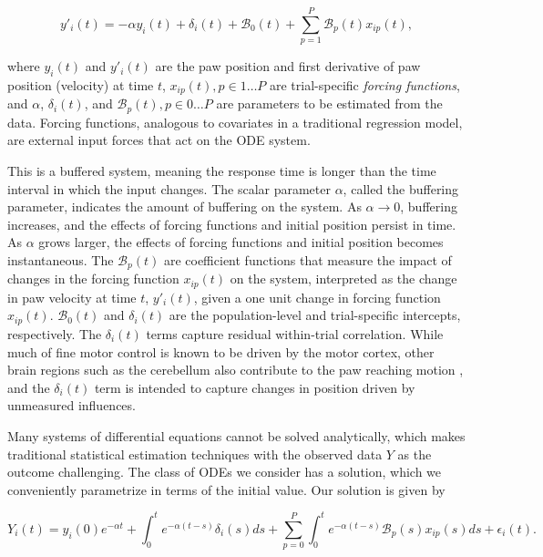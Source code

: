 \documentclass[preprint]{JASA}
\begin{document}
\begin{equation}
\label{eq:flode_deriv}
y'_i(t) = -\alpha y_i(t) + \delta_i(t) + \mathcal{B}_0(t) + \sum_{p = 1}^P \mathcal{B}_p(t) x_{ip}(t),
\end{equation}

\noindent where \(y_i(t)\) and \(y'_i(t)\) are the paw position and
first derivative of paw position (velocity) at time \(t\),
\(x_{ip}(t), p \in 1\ldots P\) are trial-specific \emph{forcing
functions}, and \(\alpha\), \(\delta_i(t)\), and
\(\mathcal{B}_p(t), p\in 0\ldots P\) are parameters to be estimated from
the data. Forcing functions, analogous to covariates in a traditional
regression model, are external input forces that act on the ODE system.

This is a buffered system, meaning the response time is longer than the
time interval in which the input changes. The scalar parameter
\(\alpha\), called the buffering parameter, indicates the amount of
buffering on the system. As \(\alpha \to 0\), buffering increases, and
the effects of forcing functions and initial position persist in time.
As \(\alpha\) grows larger, the effects of forcing functions and initial
position becomes instantaneous. The \(\mathcal{B}_p(t)\) are coefficient
functions that measure the impact of changes in the forcing function
\(x_{ip}(t)\) on the system, interpreted as the change in paw velocity
at time \(t\), \(y'_i(t)\), given a one unit change in forcing function
\(x_{ip}(t)\). \(\mathcal{B}_0(t)\) and \(\delta_i(t)\) are the
population-level and trial-specific intercepts, respectively. The
\(\delta_i(t)\) terms capture residual within-trial correlation. While
much of fine motor control is known to be driven by the motor cortex,
other brain regions such as the cerebellum also contribute to the paw
reaching motion \citep{becker2020}, and the \(\delta_i(t)\) term is
intended to capture changes in position driven by unmeasured influences.

Many systems of differential equations cannot be solved analytically,
which makes traditional statistical estimation techniques with the
observed data \(Y\) as the outcome challenging. The class of ODEs we
consider has a solution, which we conveniently parametrize in terms of
the initial value. Our solution is given by

\begin{equation}
\label{eq:flode_mod}    
    Y_i(t) = y_i(0)e^{-\alpha t} + \int_0^t e^{-\alpha (t-s)}\delta_i(s)ds + \sum_{p=0}^P\int_0^t e^{-\alpha (t-s)} \mathcal{B}_p(s)x_{ip}(s)ds + \epsilon_i(t).
\end{equation}
\end{document}
